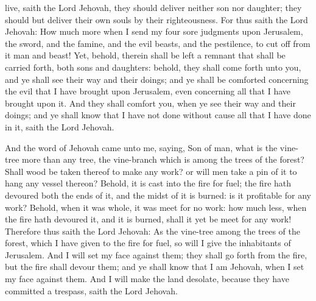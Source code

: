 live, saith the Lord Jehovah, they should deliver neither son nor daughter; they should but deliver their own souls by their righteousness.  For thus saith the Lord Jehovah: How much more when I send my four sore judgments upon Jerusalem, the sword, and the famine, and the evil beasts, and the pestilence, to cut off from it man and beast! Yet, behold, therein shall be left a remnant that shall be carried forth, both sons and daughters: behold, they shall come forth unto you, and ye shall see their way and their doings; and ye shall be comforted concerning the evil that I have brought upon Jerusalem, even concerning all that I have brought upon it. And they shall comfort you, when ye see their way and their doings; and ye shall know that I have not done without cause all that I have done in it, saith the Lord Jehovah. 

And the word of Jehovah came unto me, saying, Son of man, what is the vine-tree more than any tree, the vine-branch which is among the trees of the forest? Shall wood be taken thereof to make any work? or will men take a pin of it to hang any vessel thereon? Behold, it is cast into the fire for fuel; the fire hath devoured both the ends of it, and the midst of it is burned: is it profitable for any work? Behold, when it was whole, it was meet for no work: how much less, when the fire hath devoured it, and it is burned, shall it yet be meet for any work! Therefore thus saith the Lord Jehovah: As the vine-tree among the trees of the forest, which I have given to the fire for fuel, so will I give the inhabitants of Jerusalem. And I will set my face against them; they shall go forth from the fire, but the fire shall devour them; and ye shall know that I am Jehovah, when I set my face against them. And I will make the land desolate, because they have committed a trespass, saith the Lord Jehovah. 

